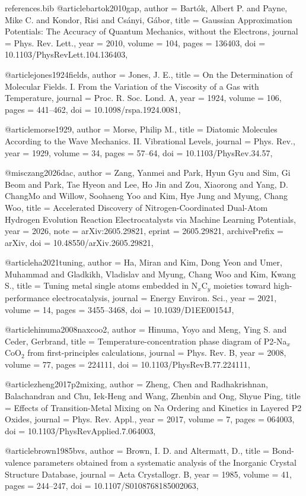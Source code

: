 \begin{filecontents*}[overwrite]{references.bib}
@article{bartok2010gap,
  author = {Bart{\'o}k, Albert P. and Payne, Mike C. and Kondor, Risi and Cs{\'a}nyi, G{\'a}bor},
  title = {Gaussian Approximation Potentials: The Accuracy of Quantum Mechanics, without the Electrons},
  journal = {Phys. Rev. Lett.},
  year = {2010},
  volume = {104},
  pages = {136403},
  doi = {10.1103/PhysRevLett.104.136403},
}


@article{jones1924fields,
  author = {Jones, J. E.},
  title = {On the Determination of Molecular Fields. I. From the Variation of the Viscosity of a Gas with Temperature},
  journal = {Proc. R. Soc. Lond. A},
  year = {1924},
  volume = {106},
  pages = {441--462},
  doi = {10.1098/rspa.1924.0081},
}

@article{morse1929,
  author = {Morse, Philip M.},
  title = {Diatomic Molecules According to the Wave Mechanics. II. Vibrational Levels},
  journal = {Phys. Rev.},
  year = {1929},
  volume = {34},
  pages = {57--64},
  doi = {10.1103/PhysRev.34.57},
}

@misc{zang2026dac,
  author = {Zang, Yanmei and Park, Hyun Gyu and Sim, Gi Beom and Park, Tae Hyeon and Lee, Ho Jin and Zou, Xiaorong and Yang, D. ChangMo and Willow, Soohaeng Yoo and Kim, Hye Jung and Myung, Chang Woo},
  title = {Accelerated Discovery of Nitrogen-Coordinated Dual-Atom Hydrogen Evolution Reaction Electrocatalysts via Machine Learning Potentials},
  year = {2026},
  note = {arXiv:2605.29821},
  eprint = {2605.29821},
  archivePrefix = {arXiv},
  doi = {10.48550/arXiv.2605.29821},
}

@article{ha2021tuning,
  author = {Ha, Miran and Kim, Dong Yeon and Umer, Muhammad and Gladkikh, Vladislav and Myung, Chang Woo and Kim, Kwang S.},
  title = {Tuning metal single atoms embedded in {N$_x$C$_y$} moieties toward high-performance electrocatalysis},
  journal = {Energy Environ. Sci.},
  year = {2021},
  volume = {14},
  pages = {3455--3468},
  doi = {10.1039/D1EE00154J},
}

@article{hinuma2008naxcoo2,
  author = {Hinuma, Yoyo and Meng, Ying S. and Ceder, Gerbrand},
  title = {Temperature-concentration phase diagram of {P2}-{Na$_x$CoO$_2$} from first-principles calculations},
  journal = {Phys. Rev. B},
  year = {2008},
  volume = {77},
  pages = {224111},
  doi = {10.1103/PhysRevB.77.224111},
}

@article{zheng2017p2mixing,
  author = {Zheng, Chen and Radhakrishnan, Balachandran and Chu, Iek-Heng and Wang, Zhenbin and Ong, Shyue Ping},
  title = {Effects of Transition-Metal Mixing on Na Ordering and Kinetics in Layered {P2} Oxides},
  journal = {Phys. Rev. Appl.},
  year = {2017},
  volume = {7},
  pages = {064003},
  doi = {10.1103/PhysRevApplied.7.064003},
}

@article{brown1985bvs,
  author = {Brown, I. D. and Altermatt, D.},
  title = {Bond-valence parameters obtained from a systematic analysis of the Inorganic Crystal Structure Database},
  journal = {Acta Crystallogr. B},
  year = {1985},
  volume = {41},
  pages = {244--247},
  doi = {10.1107/S0108768185002063},
}

\end{filecontents*}

